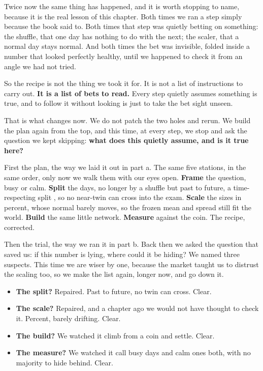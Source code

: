 \documentclass[11pt]{article} %
\begin{document}
Twice now the same thing has happened, and it is worth stopping to name, because it is the real lesson of this chapter. Both times we ran a step simply because the book said to. Both times that step was quietly betting on something: the shuffle, that one day has nothing to do with the next; the scaler, that a normal day stays normal. And both times the bet was invisible, folded inside a number that looked perfectly healthy, until we happened to check it from an angle we had not tried.

So the recipe is not the thing we took it for. It is not a list of instructions to carry out. \textbf{It is a list of bets to read.} Every step quietly assumes something is true, and to follow it without looking is just to take the bet sight unseen.

That is what changes now. We do not patch the two holes and rerun. We build the plan again from the top, and this time, at every step, we stop and ask the question we kept skipping: \textbf{what does this quietly assume, and is it true here?}

First the plan, the way we laid it out in part a. The same five stations, in the same order, only now we walk them with our eyes open. \textbf{Frame} the question, busy or calm. \textbf{Split} the days, no longer by a shuffle but past to future, a time-respecting split \cite{tashman:2000,bergmeir:2012}, so no near-twin can cross into the exam. \textbf{Scale} the sizes in percent, whose normal barely moves, so the frozen mean and spread still fit the world. \textbf{Build} the same little network. \textbf{Measure} against the coin. The recipe, corrected.

Then the trial, the way we ran it in part b. Back then we asked the question that saved us: if this number is lying, where could it be hiding? We named three suspects. This time we are wiser by one, because the market taught us to distrust the scaling too, so we make the list again, longer now, and go down it.

\begin{itemize}
\item \textbf{The split?} Repaired. Past to future, no twin can cross. Clear.
\item \textbf{The scale?} Repaired, and a chapter ago we would not have thought to check it. Percent, barely drifting. Clear.
\item \textbf{The build?} We watched it climb from a coin and settle. Clear.
\item \textbf{The measure?} We watched it call busy days and calm ones both, with no majority to hide behind. Clear.
\end{itemize}
\end{document}
